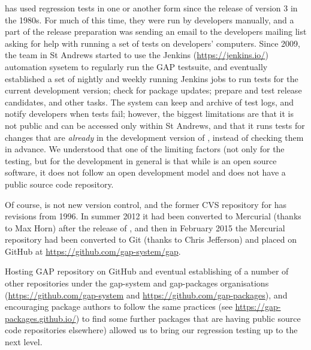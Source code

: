 \documentclass{deliverablereport}
\begin{document}
\GAP has used regression tests in one or another form since the
release of version 3 in the 1980s. For much of this time, they were
run by developers manually, and a part of the
release preparation was sending an email to the \GAP developers mailing
list asking for help with running a set of tests on developers' 
computers. Since 2009, the \GAP team in St Andrews started to use the Jenkins
(\url{https://jenkins.io/}) automation sysetem to regularly run the 
GAP testsuite, and eventually established a set of nightly and weekly
running Jenkins jobs to run tests for the current \GAP development
version; check for package updates; prepare and test release candidates,
and other tasks. The system can keep and archive of test logs, and notify
developers when tests fail; however, the biggest limitations are that
it is not public and can be accessed only within St Andrews, and that 
it runs tests for changes that are \emph{already} in the development
version of \GAP, instead of checking them in advance. We understood
that one of the limiting factors (not only for the testing, but for
the \GAP development in general is that while \GAP is an open source 
software, it does not follow an open development model and does not
have a public source code repository. 


Of course, \GAP is not new  version control, and the former
CVS repository for  has revisions from 1996. In summer 2012 it
had been converted to Mercurial (thanks to Max Horn) after the release 
of , and then in February 2015 the Mercurial repository had 
been converted to Git (thanks to Chris Jefferson) and placed on GitHub
at \url{https://github.com/gap-system/gap}.

  
Hosting GAP repository on GitHub and eventual establishing of a number
of other repositories under the gap-system and gap-packages 
organisations (\url{https://github.com/gap-system} and 
\url{https://github.com/gap-packages}), and encouraging package authors 
to follow the same practices (see \url{https://gap-packages.github.io/})
to find some further packages that are having public source code 
repositories elsewhere) allowed us to bring our regression testing
up to the next level.
\end{document}
